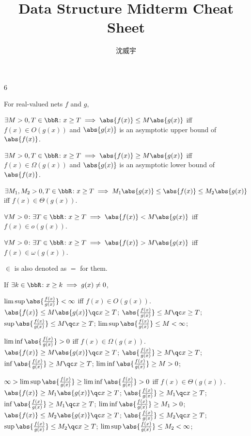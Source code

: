 \documentclass[a4paper,10pt]{extarticle}
\title{Data Structure Midterm Cheat Sheet}
\author{沈威宇}
\date{\temtoday}
\begin{document}
\temdoc
\fontsize{5pt}{6pt}\selectfont
\begin{multicols}{6}




For real-valued nets $f$ and $g$,

$\exists M>0,T\in\bbR\colon x\ge T\implies\abs{f(x)}\le M\abs{g(x)}$ iff $f(x)\in O(g(x))$ and $\abs{g(x)}$ is an asymptotic upper bound of $\abs{f(x)}$.

$\exists M>0,T\in\bbR\colon x\ge T\implies\abs{f(x)}\ge M\abs{g(x)}$ iff $f(x)\in \Omega(g(x))$ and $\abs{g(x)}$ is an asymptotic lower bound of $\abs{f(x)}$.

$\exists M_1,M_2>0,T\in\bbR\colon x\ge T\implies M_1\abs{g(x)}\le\abs{f(x)}\le M_2\abs{g(x)}$ iff $f(x)\in \Theta(g(x))$.

$\forall M>0\colon\exists T\in\bbR\colon x\ge T\implies\abs{f(x)}<M\abs{g(x)}$ iff $f(x)\in o(g(x))$.

$\forall M>0\colon\exists T\in\bbR\colon x\ge T\implies\abs{f(x)}>M\abs{g(x)}$ iff $f(x)\in \omega(g(x))$.

$\in$ is also denoted as $=$ for them.


If $\exists k\in\bbR\colon x\ge k\implies g(x)\ne0$,

$\limsup\abs{\frac{f(x)}{g(x)}}<\infty$ iff $f(x)\in O(g(x))$.
\bpr
\(\abs{f(x)}\le M\abs{g(x)}\qc x\ge T\); 
\(\abs{\frac{f(x)}{g(x)}}\le M\qc x\ge T\); 
\(\sup\abs{\frac{f(x)}{g(x)}}\le M\qc x\ge T\); 
\(\limsup\abs{\frac{f(x)}{g(x)}}\le M<\infty\); 
\epr

$\liminf\abs{\frac{f(x)}{g(x)}}>0$ iff $f(x)\in \Omega(g(x))$.
\bpr
\(\abs{f(x)}\ge M\abs{g(x)}\qc x\ge T\); 
\(\abs{\frac{f(x)}{g(x)}}\ge M\qc x\ge T\); 
\(\inf\abs{\frac{f(x)}{g(x)}}\ge M\qc x\ge T\); 
\(\liminf\abs{\frac{f(x)}{g(x)}}\ge M>0\); 
\epr

$\infty>\limsup\abs{\frac{f(x)}{g(x)}}\ge\liminf\abs{\frac{f(x)}{g(x)}}>0$ iff $f(x)\in \Theta(g(x))$.
\bpr
\(\abs{f(x)}\ge M_1\abs{g(x)}\qc x\ge T\); 
\(\abs{\frac{f(x)}{g(x)}}\ge M_1\qc x\ge T\); 
\(\inf\abs{\frac{f(x)}{g(x)}}\ge M_1\qc x\ge T\); 
\(\liminf\abs{\frac{f(x)}{g(x)}}\ge M_1>0\); 
\(\abs{f(x)}\le M_2\abs{g(x)}\qc x\ge T\); 
\(\abs{\frac{f(x)}{g(x)}}\le M_2\qc x\ge T\); 
\(\sup\abs{\frac{f(x)}{g(x)}}\le M_2\qc x\ge T\); 
\(\limsup\abs{\frac{f(x)}{g(x)}}\le M_2<\infty\); 
\epr


\end{multicols}
\end{document}
